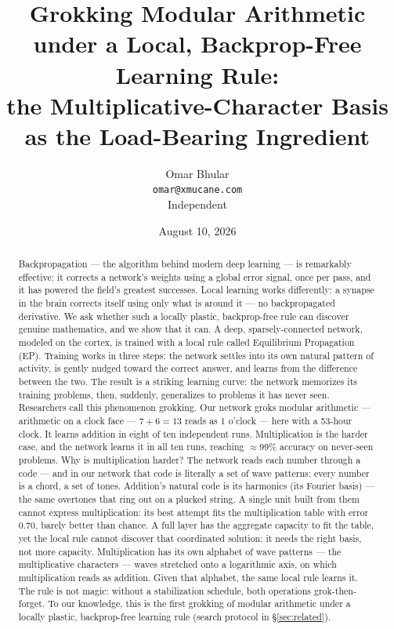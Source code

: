 \documentclass[11pt]{article}
\title{\textbf{Grokking Modular Arithmetic under a Local, Backprop-Free Learning Rule:\\ the Multiplicative-Character Basis as the Load-Bearing Ingredient}}
\author{Omar Bhular\\[2pt] {\small \texttt{omar@xmucane.com}}\\[2pt] {\small Independent}}
\date{August 10, 2026}
\begin{document}
\maketitle

\begin{abstract}
Backpropagation --- the algorithm behind modern deep learning --- is remarkably effective: it corrects a network's weights using a global error signal, once per pass, and it has powered the field's greatest successes. Local learning works differently: a synapse in the brain corrects itself using only what is around it --- no backpropagated derivative. We ask whether such a locally plastic, backprop-free rule can discover genuine mathematics, and we show that it can. A deep, sparsely-connected network, modeled on the cortex, is trained with a local rule called Equilibrium Propagation (EP). Training works in three steps: the network settles into its own natural pattern of activity, is gently nudged toward the correct answer, and learns from the difference between the two. The result is a striking learning curve: the network memorizes its training problems, then, suddenly, generalizes to problems it has never seen. Researchers call this phenomenon grokking. Our network groks modular arithmetic --- arithmetic on a clock face --- $7+6=13$ reads as 1 o'clock --- here with a 53-hour clock. It learns addition in eight of ten independent runs. Multiplication is the harder case, and the network learns it in all ten runs, reaching $\approx$99\% accuracy on never-seen problems. Why is multiplication harder? The network reads each number through a code --- and in our network that code is literally a set of wave patterns: every number is a chord, a set of tones. Addition's natural code is its harmonics (its Fourier basis) --- the same overtones that ring out on a plucked string. A single unit built from them cannot express multiplication: its best attempt fits the multiplication table with error 0.70, barely better than chance. A full layer has the aggregate capacity to fit the table, yet the local rule cannot discover that coordinated solution: it needs the right basis, not more capacity. Multiplication has its own alphabet of wave patterns --- the multiplicative characters --- waves stretched onto a logarithmic axis, on which multiplication reads as addition. Given that alphabet, the same local rule learns it. The rule is not magic: without a stabilization schedule, both operations grok-then-forget. To our knowledge, this is the first grokking of modular arithmetic under a locally plastic, backprop-free learning rule (search protocol in \S\ref{sec:related}).
\end{abstract}
\end{document}
